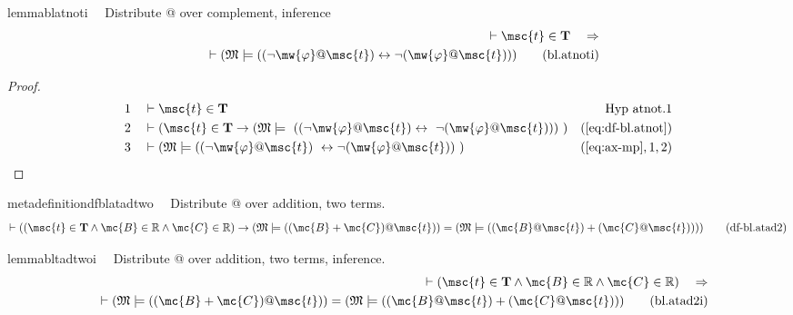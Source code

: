 \begin{restatable}{lemma}{blatnoti}~~ Distribute @ over complement, inference
\begin{align}
\vdash \msc{t} \in \mathbf{T}\quad\Rightarrow \notag \\ 
	\quad \vdash ( \mathfrak{M}
    \models ( ( \lnot \mw{\varphi} @ \msc{t} ) \leftrightarrow \lnot (
    \mw{\varphi} @ \msc{t} ) ) )\label{eq:bl.atnoti}\tag{bl.atnoti}
\end{align}
\end{restatable}

\begin{proof}
\begin{align}
  1 &&  & \vdash \msc{t} \in \mathbf{T}&\text{Hyp~atnot.1}\notag%
  \\ 2 &&  & \vdash ( \msc{t} \in \mathbf{T} \rightarrow ( \mathfrak{M} \models
     ~( ( \lnot \mw{\varphi} @ \msc{t} ) \leftrightarrow
     ~\lnot ( \mw{\varphi} @ \msc{t} ) ) )
     ~)&(\mbox{\ref{eq:df-bl.atnot}})\notag
  \\ 3 &&  & \vdash ( \mathfrak{M} \models ( ( \lnot \mw{\varphi} @ \msc{t} )
     ~\leftrightarrow \lnot ( \mw{\varphi} @ \msc{t} ) )
     ~)&(\mbox{\ref{eq:ax-mp}},1,2)\notag
\end{align}
\end{proof}

\begin{restatable}{metadefinition}{dfblatadtwo}~~ Distribute @ over addition, two
terms.
\begin{align}
\vdash ( ( \msc{t} \in \mathbf{T} \wedge \mc{B} \in \mathbb{R} \wedge \mc{C}
    \in \mathbb{R} ) \rightarrow ( \mathfrak{M} \models ( ( \mc{B} + \mc{C} ) @
    \msc{t} ) ) = ( \mathfrak{M} \models ( ( \mc{B} @ \msc{t} ) + ( \mc{C} @
    \msc{t} ) ) ) )\label{eq:df-bl.atad2}\tag{df-bl.atad2}
\end{align}
\end{restatable}

\begin{restatable}{lemma}{bltadtwoi}~~ Distribute @ over addition, two terms,
inference.
\begin{align}
\vdash ( \msc{t} \in \mathbf{T} \wedge \mc{B} \in \mathbb{R} \wedge \mc{C} \in
    \mathbb{R} )\quad\Rightarrow \notag \\ 
	\quad \vdash ( \mathfrak{M} \models ( ( \mc{B}
    + \mc{C} ) @ \msc{t} ) ) = ( \mathfrak{M} \models ( ( \mc{B} @ \msc{t} ) +
    ( \mc{C} @ \msc{t} ) ) )\label{eq:bl.atad2i}\tag{bl.atad2i}
\end{align}
\end{restatable}

